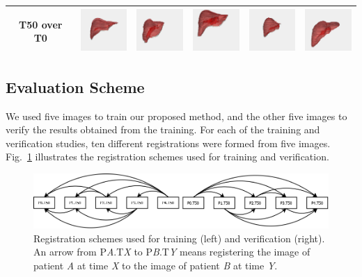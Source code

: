 \documentclass[]{spie}  %
\begin{document}
\begin{table}
\begin{center}
\begin{tabular}{c|c|c|c|c|c}
T50 over T0 & \includegraphics[width=0.7in]{seg_p0t0_t50} & \includegraphics[width=0.7in]{seg_p1t0_t50} & \includegraphics[width=0.7in]{seg_p2t0_t50} & \includegraphics[width=0.7in]{seg_p3t20_t50} & \includegraphics[width=0.7in]{seg_p4t0_t50} \\
\hline
\end{tabular}
\end{center}
\end{table}

\subsection{Evaluation Scheme}

We used five images to train our proposed method, and the other five images to verify the results obtained from the training. For each of the training and verification studies, ten different registrations were formed from five images.
Fig.~\ref{fig:testing_schemes} illustrates the registration schemes used for training and verification.

\begin{figure}
\begin{center}
\includegraphics[width=5in]{registrations_for_validation}
\end{center}
\caption{Registration schemes used for training (left) and verification (right). An arrow from P\textit{A}.T\textit{X} to P\textit{B}.T\textit{Y} means registering the image of patient \textit{A} at time \textit{X} to the image of patient \textit{B} at time \textit{Y}.}
\label{fig:testing_schemes}
\end{figure}
\end{document}
